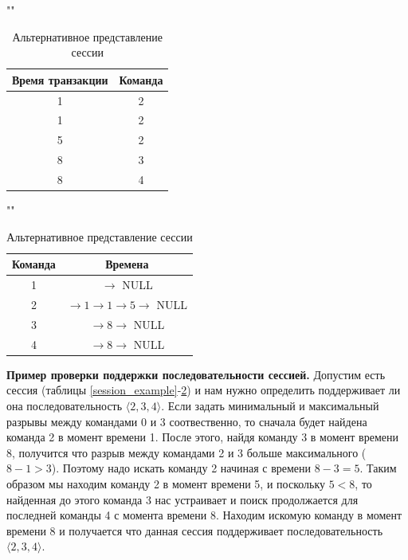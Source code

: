 \begin{table}[H]
	\begin{minipage}[h]{0.49\linewidth}
		\caption{Пример сессии}
		\label{session_example}
		""\newline
		\begin{tabular}{ | c | c | }
			\hline
			Время транзакции & Команда \\ \hline
			1 & 2 \\ \hline
			1 & 2 \\ \hline
			5 & 2 \\ \hline
			8 & 3 \\ \hline
			8 & 4 \\ \hline
		\end{tabular}
	\end{minipage}
	\begin{minipage}[h]{0.49\linewidth}
		\caption{Альтернативное представление сессии}
		\label{session_alternative_representation}
		""\newline
		\begin{tabular}{ | c | c | }
			\hline
			Команда & Времена \\ \hline
			1 & $\rightarrow$ NULL \\ \hline
			2 & $\rightarrow 1 \rightarrow 1 \rightarrow 5 \rightarrow$ NULL \\ \hline
			3 & $\rightarrow 8 \rightarrow$ NULL \\ \hline
			4 & $\rightarrow 8 \rightarrow$ NULL \\ \hline
		\end{tabular}
	\end{minipage}
\end{table}


\textbf{Пример проверки поддержки последовательности сессией.} Допустим есть сессия (таблицы \ref{session_example}-\ref{session_alternative_representation}) и нам нужно определить поддерживает ли она последовательность $\langle2,3,4\rangle$. Если задать минимальный и максимальный разрывы между командами 0 и 3 соотвественно, то сначала будет найдена команда 2 в момент времени 1. После этого, найдя команду 3 в момент времени 8, получится что разрыв между командами 2 и 3 больше максимального ($8-1>3$). Поэтому надо искать команду 2 начиная с времени $8-3=5$. Таким образом мы находим команду 2 в момент времени 5, и поскольку $5<8$, то найденная до этого команда 3 нас устраивает и поиск продолжается для последней команды 4 с момента времени 8. Находим искомую команду в момент времени 8 и получается что данная сессия поддерживает последовательность $\langle2,3,4\rangle$.

